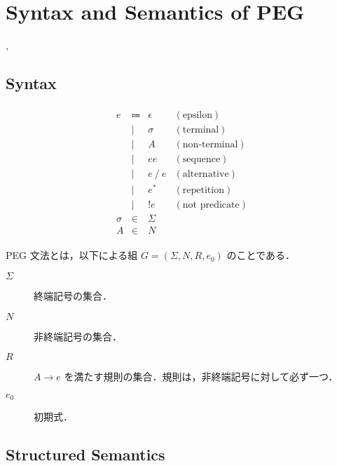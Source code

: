 \section{Syntax and Semantics of PEG}

\cite{Ford:2002}, \cite{Ford:2004}

\subsection{Syntax}

\begin{align*}
  \begin{array}{rclr}
  e
  & \Coloneq & \epsilon &(\text{epsilon}) \\
  & \mid & \sigma &(\text{terminal}) \\
  & \mid & A &(\text{non-terminal}) \\
  & \mid & e e &(\text{sequence}) \\
  & \mid & e \mathrel{/} e &(\text{alternative}) \\
  & \mid & e^* &(\text{repetition}) \\
  & \mid & \mathop{!} e &(\text{not predicate}) \\
  \sigma
  & \in & \Sigma \\
  A
  & \in & N
  \end{array}
\end{align*}

\begin{definition}
  PEG 文法とは，以下による組 $G = (\Sigma, N, R, e_0)$ のことである．
  \begin{description}
    \item[$\Sigma$] 終端記号の集合．
    \item[$N$] 非終端記号の集合．
    \item[$R$] $A \to e$ を満たす規則の集合．規則は，非終端記号に対して必ず一つ．
    \item[$e_0$] 初期式．
  \end{description}
\end{definition}

\subsection{Structured Semantics}

